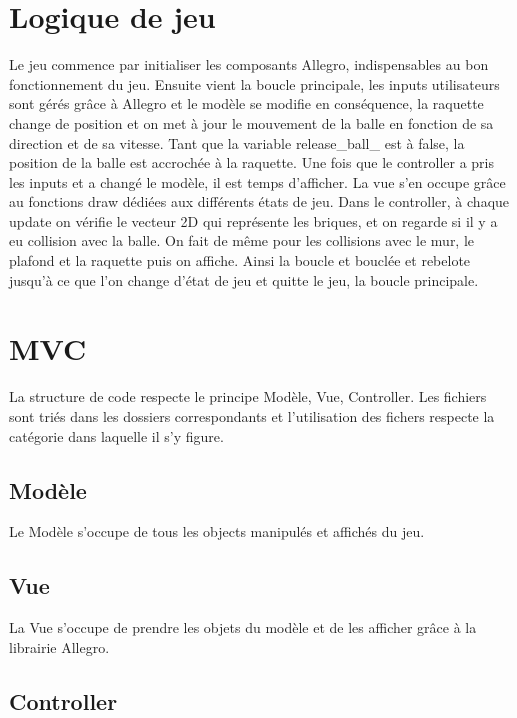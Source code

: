 \documentclass{article}
\begin{document}
\section{Logique de jeu}

Le jeu commence par initialiser les composants Allegro, indispensables au bon fonctionnement du jeu. Ensuite vient la boucle principale, les inputs utilisateurs sont gérés grâce à Allegro 
et le modèle se modifie en conséquence, la raquette change de position et on met à jour le mouvement de la balle en fonction de sa direction et de sa vitesse. Tant que la variable release\_ball\_ 
est à false, la position de la balle est accrochée à la raquette. Une fois que le controller a pris les inputs et a changé le modèle, il est temps d'afficher. La vue s'en occupe grâce au fonctions
draw dédiées aux différents états de jeu. Dans le controller, à chaque update on vérifie le vecteur 2D qui représente les briques, et on regarde si il y a eu collision avec la balle. On fait de même 
pour les collisions avec le mur, le plafond et la raquette puis on affiche. Ainsi la boucle et bouclée et rebelote jusqu'à ce que l'on change d'état de jeu et quitte le jeu, la boucle principale.

\section{MVC}

La structure de code respecte le principe Modèle, Vue, Controller. Les fichiers sont triés dans les dossiers correspondants et l'utilisation des fichers respecte la catégorie dans laquelle il s'y figure.

\subsection{Modèle}

Le Modèle s'occupe de tous les objects manipulés et affichés du jeu.

\subsection{Vue}

La Vue s'occupe de prendre les objets du modèle et de les afficher grâce à la librairie Allegro.

\subsection{Controller}
\end{document}
